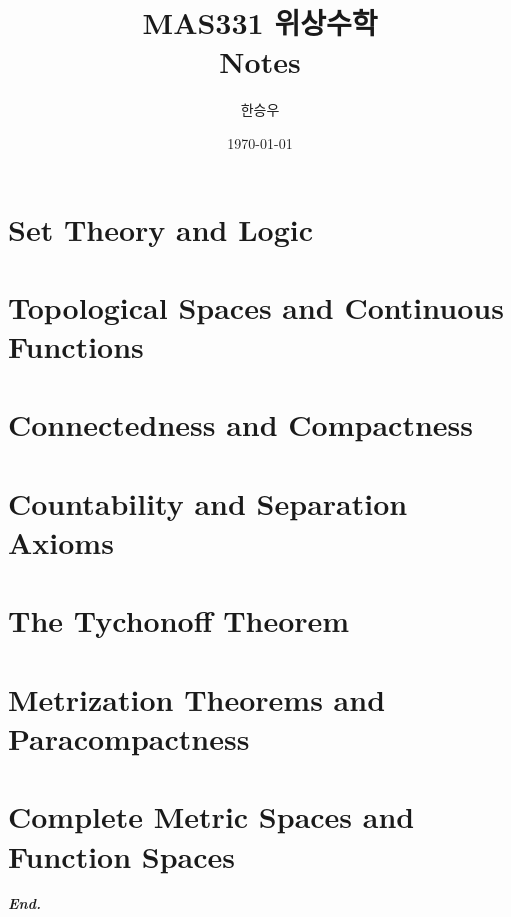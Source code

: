 \documentclass[a4paper,12pt]{report}
\title{\Huge{MAS331 위상수학}\\Notes}
\author{\huge{한승우}}
\date{\today}
\begin{document}
\maketitle
\newpage
{}
\tikzexternaldisable
\tableofcontents
\tikzexternalenable
\pagebreak

\chapter{Set Theory and Logic}
 

\chapter{Topological Spaces and Continuous Functions}


\chapter{Connectedness and Compactness}


\chapter{Countability and Separation Axioms}


\chapter{The Tychonoff Theorem}


\chapter{Metrization Theorems and Paracompactness}

\chapter{Complete Metric Spaces and Function Spaces}


\vfill
\begin{center}
    \textbf{\textit{End.}}
\end{center}
\end{document}
